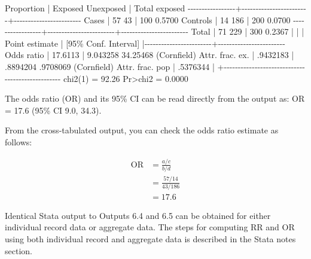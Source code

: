\documentclass[
]{memoir}
\newenvironment{Shaded}{\begin{snugshade}}{\end{snugshade}}
\newcommand{\NormalTok}[1]{#1}
\begin{document}
\begin{Shaded}
\begin{Highlighting}[]
\NormalTok{                                                         Proportion}
\NormalTok{                 |   Exposed   Unexposed  |      Total      exposed}
\NormalTok{{-}{-}{-}{-}{-}{-}{-}{-}{-}{-}{-}{-}{-}{-}{-}{-}{-}+{-}{-}{-}{-}{-}{-}{-}{-}{-}{-}{-}{-}{-}{-}{-}{-}{-}{-}{-}{-}{-}{-}{-}{-}+{-}{-}{-}{-}{-}{-}{-}{-}{-}{-}{-}{-}{-}{-}{-}{-}{-}{-}{-}{-}{-}{-}{-}{-}}
\NormalTok{           Cases |        57          43  |        100       0.5700}
\NormalTok{        Controls |        14         186  |        200       0.0700}
\NormalTok{{-}{-}{-}{-}{-}{-}{-}{-}{-}{-}{-}{-}{-}{-}{-}{-}{-}+{-}{-}{-}{-}{-}{-}{-}{-}{-}{-}{-}{-}{-}{-}{-}{-}{-}{-}{-}{-}{-}{-}{-}{-}+{-}{-}{-}{-}{-}{-}{-}{-}{-}{-}{-}{-}{-}{-}{-}{-}{-}{-}{-}{-}{-}{-}{-}{-}}
\NormalTok{           Total |        71         229  |        300       0.2367}
\NormalTok{                 |                        |}
\NormalTok{                 |      Point estimate    |    [95\% Conf. Interval]}
\NormalTok{                 |{-}{-}{-}{-}{-}{-}{-}{-}{-}{-}{-}{-}{-}{-}{-}{-}{-}{-}{-}{-}{-}{-}{-}{-}+{-}{-}{-}{-}{-}{-}{-}{-}{-}{-}{-}{-}{-}{-}{-}{-}{-}{-}{-}{-}{-}{-}{-}{-}}
\NormalTok{      Odds ratio |          17.6113       |    9.043258    34.25468 (Cornfield)}
\NormalTok{ Attr. frac. ex. |         .9432183       |    .8894204    .9708069 (Cornfield)}
\NormalTok{ Attr. frac. pop |         .5376344       |}
\NormalTok{                 +{-}{-}{-}{-}{-}{-}{-}{-}{-}{-}{-}{-}{-}{-}{-}{-}{-}{-}{-}{-}{-}{-}{-}{-}{-}{-}{-}{-}{-}{-}{-}{-}{-}{-}{-}{-}{-}{-}{-}{-}{-}{-}{-}{-}{-}{-}{-}{-}{-}}
\NormalTok{                               chi2(1) =    92.26  Pr\textgreater{}chi2 = 0.0000}
\end{Highlighting}
\end{Shaded}

The odds ratio (OR) and its 95\% CI can be read directly from the output as: OR = 17.6 (95\% CI 9.0, 34.3).

From the cross-tabulated output, you can check the odds ratio estimate as follows:

\[
\begin{aligned}
\text{OR} &= \frac{a / c}{b /d} \\
  &= \frac{57 / 14}{43 / 186} \\
  &= 17.6
\end{aligned}
\]

Identical Stata output to Outputs 6.4 and 6.5 can be obtained for either individual record data or aggregate data. The steps for computing RR and OR using both individual record and aggregate data is described in the Stata notes section.
\end{document}

